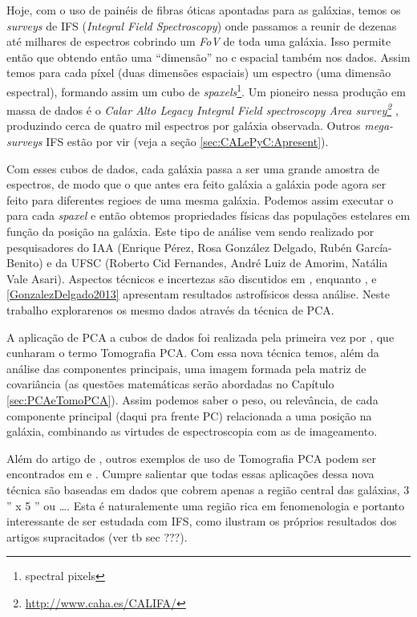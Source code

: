 Hoje, com o uso de painéis de fibras óticas apontadas para as galáxias, temos os {\em surveys} de IFS ({\em Integral
Field Spectroscopy}) onde passamos a reunir de dezenas até milhares de espectros cobrindo um {\em FoV} de toda uma
galáxia. Isso permite então que obtendo então uma ``dimensão'' no c espacial também nos dados. Assim temos para cada
píxel (duas dimensões espaciais) um espectro (uma dimensão espectral), formando assim um cubo de {\em
spaxels}\footnote{spectral pixels}. Um pioneiro nessa produção em massa de dados é o {\em Calar Alto Legacy Integral
Field spectroscopy Area survey\footnote{\url{http://www.caha.es/CALIFA/}}} \citep[CALIFA; ][]{CALIFAPresent2012},
produzindo cerca de quatro mil espectros por galáxia observada. Outros {\em mega-surveys} IFS estão por vir (veja a
seção \ref{sec:CALePyC:Apresent}).

Com esses cubos de dados, cada galáxia passa a ser uma grande amostra de espectros, de modo que o que antes era feito
galáxia a galáxia pode agora ser feito para diferentes regioes de uma mesma galáxia. Podemos assim executar o \starlight
para cada {\em spaxel} e então obtemos propriedades físicas das populações estelares em função da posição na galáxia.
Este tipo de análise vem sendo realizado por pesquisadores do IAA (Enrique Pérez, Rosa González Delgado, Rubén
García-Benito) e da UFSC (Roberto Cid Fernandes, André Luiz de Amorim, Natália Vale Asari). Aspectos técnicos e
incertezas são discutidos em \ojo \citep{CidFernandes2013, CidFernandes2014}, enquanto \citep{Perez2013}, e
\ref{GonzalezDelgado2013} apresentam resultados astrofísicos dessa análise. Neste trabalho explorarenos os mesmo dados
através da técnica de PCA.

A aplicação de PCA a cubos de dados foi realizada pela primeira vez por \citet{Steiner2009}, que cunharam o termo
Tomografia PCA. Com essa nova técnica temos, além da análise das componentes principais, uma imagem formada pela matriz
de covariância (as questões matemáticas serão abordadas no Capítulo \ref{sec:PCAeTomoPCA}). Assim podemos saber o peso,
ou relevância, de cada componente principal (daqui pra frente PC) relacionada a uma posição na galáxia, combinando as
virtudes de espectroscopia com as de imageamento.

Além do artigo de \citet{Steiner2009}, outros exemplos de uso de Tomografia PCA podem ser encontrados em
\citet{Riffel2011} e \citet{Ricci2011}. Cumpre salientar que todas essas aplicações dessa nova técnica são baseadas em
dados que cobrem apenas a \ojo região central das galáxias, 3 '' x 5 '' ou \ldots.  Esta é naturalemente uma região rica
em fenomenologia e portanto interessante de ser estudada com IFS, como ilustram os próprios resultados dos artigos
supracitados \ojo (ver tb sec ???).

